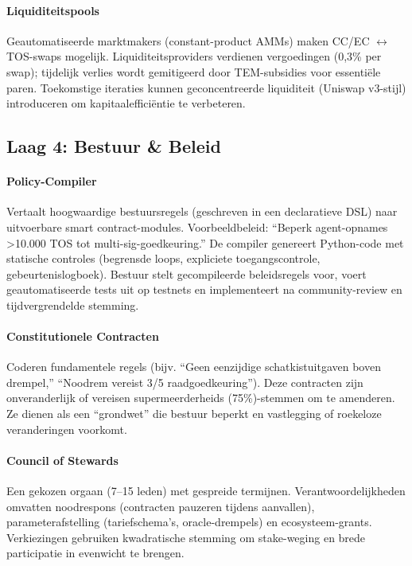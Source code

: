 \documentclass[11pt]{article}
\begin{document}
\paragraph{Liquiditeitspools} Geautomatiseerde marktmakers (constant-product AMMs) maken CC/EC $\leftrightarrow$ TOS-swaps mogelijk. Liquiditeitsproviders verdienen vergoedingen (0,3\% per swap); tijdelijk verlies wordt gemitigeerd door TEM-subsidies voor essentiële paren. Toekomstige iteraties kunnen geconcentreerde liquiditeit (Uniswap v3-stijl) introduceren om kapitaalefficiëntie te verbeteren.

\subsection{Laag 4: Bestuur \& Beleid}
\paragraph{Policy-Compiler} Vertaalt hoogwaardige bestuursregels (geschreven in een declaratieve DSL) naar uitvoerbare smart contract-modules. Voorbeeldbeleid: ``Beperk agent-opnames >10.000 TOS tot multi-sig-goedkeuring.'' De compiler genereert Python-code met statische controles (begrensde loops, expliciete toegangscontrole, gebeurtenislogboek). Bestuur stelt gecompileerde beleidsregels voor, voert geautomatiseerde tests uit op testnets en implementeert na community-review en tijdvergrendelde stemming.

\paragraph{Constitutionele Contracten} Coderen fundamentele regels (bijv. ``Geen eenzijdige schatkistuitgaven boven drempel,'' ``Noodrem vereist 3/5 raadgoedkeuring''). Deze contracten zijn onveranderlijk of vereisen supermeerderheids (75\%)-stemmen om te amenderen. Ze dienen als een ``grondwet'' die bestuur beperkt en vastlegging of roekeloze veranderingen voorkomt.

\paragraph{Council of Stewards} Een gekozen orgaan (7--15 leden) met gespreide termijnen. Verantwoordelijkheden omvatten noodrespons (contracten pauzeren tijdens aanvallen), parameterafstelling (tariefschema's, oracle-drempels) en ecosysteem-grants. Verkiezingen gebruiken kwadratische stemming om stake-weging en brede participatie in evenwicht te brengen.
\end{document}
